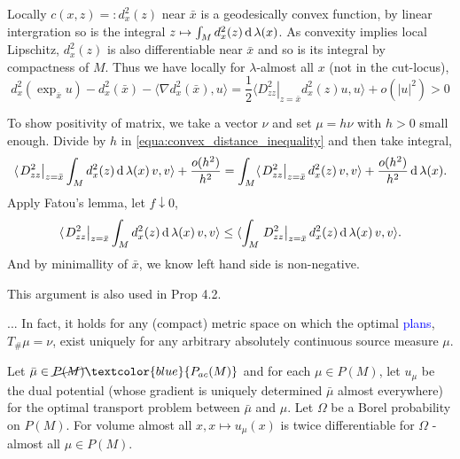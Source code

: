 Locally $c(x,z)=:d^2_x(z)$ near $\bar{x}$ is a geodesically convex function, by linear intergration so is the integral  \( z \mapsto \int _ { M } d^2_x(z) \operatorname{d} \lambda ( x ) \).
As convexity implies local Lipschitz, $d^2_x(z)$ is also differentiable near $\bar{x}$ and so is its integral by compactness of $M$.
Thus we have locally for $\lambda$-almost all $x$ (not in the cut-locus),
\begin{equation}
	\label{equa:convex_distance_inequality}
	d^2_x \left( \exp _ {\bar{x}} u \right) - d^2_x (\bar{x}) - \langle \nabla d^2_x (\bar{x}) , u \rangle = \frac { 1 } { 2 } \langle \left. D _ { z z } ^ { 2 } \right| _ { z = \bar { x } } d^2_x(z) u , u \rangle + o \left( | u | ^ { 2 } \right) > 0
\end{equation}

To show positivity of matrix, we take a vector $\nu$ and set $\mu = h \nu$ with $h > 0$ small enough.
Divide by $h$ in \cref{equa:convex_distance_inequality} and then take integral,
\[
	\langle \left. D _ { z z } ^ { 2 } \right| _ { z = \bar { x } } \int_{M} d^2_x(z) \operatorname{d} \lambda ( x )\, v , v \rangle + \frac{o (h^2)}{h^2} = \int_{M} \langle \left. D _ { z z } ^ { 2 } \right| _ { z = \bar { x } } d^2_x(z)\, v , v \rangle + \frac{o (h^2)}{h^2} \operatorname{d} \lambda ( x ).
\]
Apply Fatou's lemma, let $f\downarrow 0$,
\[
	\langle \left. D _ { z z } ^ { 2 } \right| _ { z = \bar { x } } \int_{M} d^2_x(z) \operatorname{d} \lambda ( x )\, v , v \rangle \leq \langle \int_{M} \left. D _ { z z } ^ { 2 } \right| _ { z = \bar { x } } d^2_x(z) \operatorname{d} \lambda(x)\, v, v \rangle.
\]
And by minimallity of $\bar{x}$, we know left hand side is non-negative.

This argument is also used in Prop 4.2.

\begin{rmk}[Remark 3.2]
	... In fact, it holds for any (compact) metric
	space on which the optimal  \textcolor{blue}{plans}, \( T _ { \# } \mu = \nu \), exist uniquely for any arbitrary absolutely continuous source measure \( \mu \).
\end{rmk}

\begin{lem}
	Let \( \bar { \mu } \in \cancel{P ( M )} \textcolor{blue}{P_{ac}(M)}\) and for each \( \mu \in P ( M ) \), let \( u _ { \mu } \) be the dual potential (whose gradient is uniquely determined \( \bar { \mu } \) almost everywhere) for the optimal transport problem between \( \bar { \mu } \) and \( \mu . \) Let \( \Omega \) be a Borel probability on \( P ( M ) . \) For volume almost all \( x , x \mapsto u _ { \mu } ( x ) \) is twice differentiable for \( \Omega \) -almost all \( \mu \in P ( M ) . \)
\end{lem}

